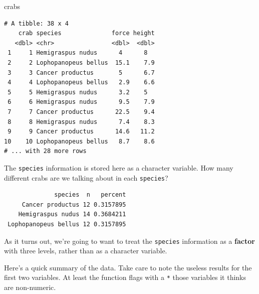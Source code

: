 \documentclass[
]{book}
\newenvironment{Shaded}{\begin{snugshade}}{\end{snugshade}}
\newcommand{\DataTypeTok}[1]{\textcolor[rgb]{0.13,0.29,0.53}{#1}}
\newcommand{\KeywordTok}[1]{\textcolor[rgb]{0.13,0.29,0.53}{\textbf{#1}}}
\newcommand{\NormalTok}[1]{#1}
\newcommand{\OperatorTok}[1]{\textcolor[rgb]{0.81,0.36,0.00}{\textbf{#1}}}
\newcommand{\StringTok}[1]{\textcolor[rgb]{0.31,0.60,0.02}{#1}}
\begin{document}
\begin{Shaded}
\begin{Highlighting}[]
\NormalTok{crabs}
\end{Highlighting}
\end{Shaded}

\begin{verbatim}
# A tibble: 38 x 4
    crab species              force height
   <dbl> <chr>                <dbl>  <dbl>
 1     1 Hemigraspus nudus      4      8  
 2     2 Lophopanopeus bellus  15.1    7.9
 3     3 Cancer productus       5      6.7
 4     4 Lophopanopeus bellus   2.9    6.6
 5     5 Hemigraspus nudus      3.2    5  
 6     6 Hemigraspus nudus      9.5    7.9
 7     7 Cancer productus      22.5    9.4
 8     8 Hemigraspus nudus      7.4    8.3
 9     9 Cancer productus      14.6   11.2
10    10 Lophopanopeus bellus   8.7    8.6
# ... with 28 more rows
\end{verbatim}

The \texttt{species} information is stored here as a character variable. How many different crabs are we talking about in each \texttt{species}?

\begin{Shaded}
\end{Shaded}

\begin{verbatim}
              species  n   percent
     Cancer productus 12 0.3157895
    Hemigraspus nudus 14 0.3684211
 Lophopanopeus bellus 12 0.3157895
\end{verbatim}

As it turns out, we're going to want to treat the \texttt{species} information as a \textbf{factor} with three levels, rather than as a character variable.

\begin{Shaded}
\end{Shaded}

Here's a quick summary of the data. Take care to note the useless results for the first two variables. At least the function flags with a \texttt{*} those variables it thinks are non-numeric.
\end{document}
